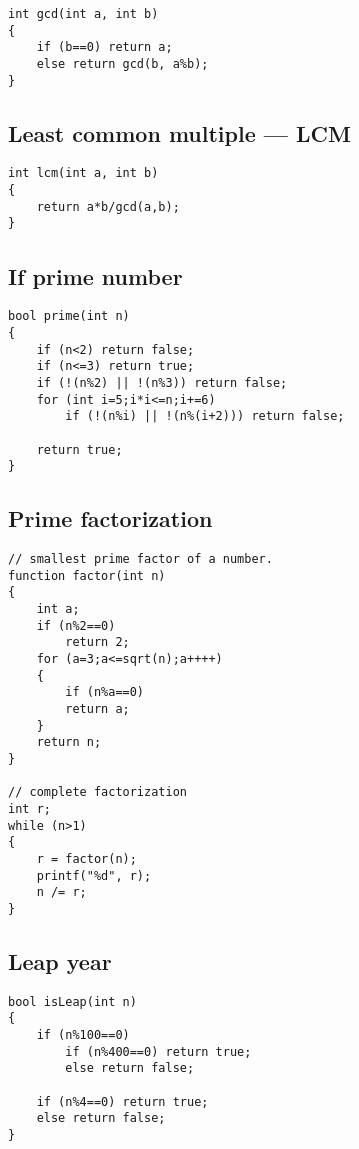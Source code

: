 \documentclass[a4paper]{article}
\begin{document}
\begin{verbatim}
int gcd(int a, int b)
{
	if (b==0) return a;
	else return gcd(b, a%b);
}
\end{verbatim}

\subsection{Least common multiple --- LCM}

\begin{verbatim}
int lcm(int a, int b)
{
	return a*b/gcd(a,b);
}
\end{verbatim}

\subsection{If prime number}

\begin{verbatim}
bool prime(int n)
{
	if (n<2) return false;
	if (n<=3) return true;
	if (!(n%2) || !(n%3)) return false;
	for (int i=5;i*i<=n;i+=6)
		if (!(n%i) || !(n%(i+2))) return false;
		
	return true;
}
\end{verbatim}

\subsection{Prime factorization}

\begin{verbatim}
// smallest prime factor of a number.
function factor(int n)
{
	int a;
	if (n%2==0)
		return 2;
	for (a=3;a<=sqrt(n);a++++)
	{
		if (n%a==0)
		return a;
	}
	return n;
}

// complete factorization
int r;
while (n>1)
{
    r = factor(n);
    printf("%d", r);
    n /= r;
}
\end{verbatim}

\subsection{Leap year}

\begin{verbatim}
bool isLeap(int n)
{
	if (n%100==0)
		if (n%400==0) return true;
		else return false;

	if (n%4==0) return true;
	else return false;
}
\end{verbatim}
\end{document}
